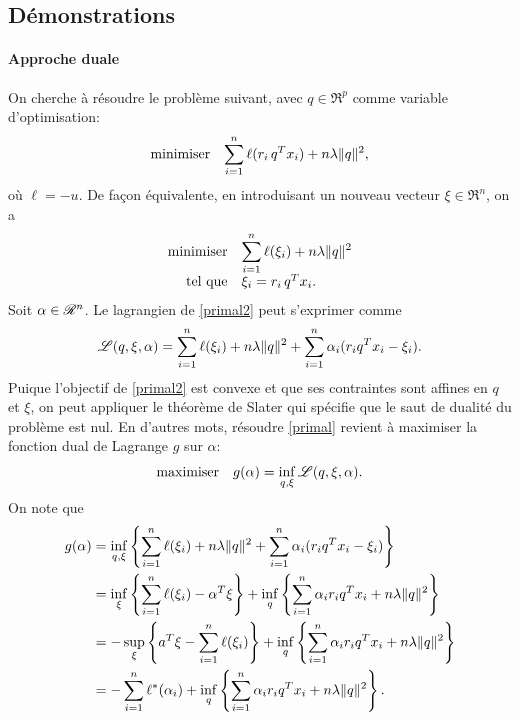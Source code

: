 \subsection{Démonstrations}

\label{k:dem}

\paragraph{Approche duale}

On cherche à résoudre le problème suivant, avec $q \in \Re^p$ comme variable d'optimisation:
\begin{equation}
  \label{primal}
  \begin{array}{ll} \displaystyle{\operatorname*{\mbox{minimiser}}_{}} & \displaystyle{\sum_{i=1}^n\ell(r_i\,q^Tx_i) + n\lambda\|q\|^2,} \end{array}
\end{equation}
où $\ell=-u$. De façon équivalente, en introduisant un nouveau vecteur $\xi \in \Re^n$, on a
\begin{equation}
  \minimizeEquationSt{\label{primal2}\sumi \ell(\xi_i) + n\lambda\|q\|^2}[\xi_i = r_i\,q^Tx_i.] 
\end{equation}
Soit $\alpha\in\mathscr{R}^n$. Le lagrangien de \eqref{primal2} peut s'exprimer comme
\begin{equation}
  \mathscr{L}(q,\xi,\alpha) = \sum_{i=1}^n \ell(\xi_i) + n\lambda\|q\|^2 + \sum_{i=1}^n \alpha_i(r_iq^Tx_i - \xi_i).
\end{equation}
Puique l'objectif de \eqref{primal2} est convexe et que ses contraintes sont affines en
$q$ et $\xi$, on peut appliquer le théorème de Slater qui spécifie que le saut de dualité
du problème est nul. En d'autres mots, résoudre \eqref{primal} revient à maximiser la
fonction dual de Lagrange $g$ sur $\alpha$:
\begin{equation}
  \displaystyle{\begin{array}{ll} \displaystyle{\operatorname*{\mbox{maximiser}}_{}} & \displaystyle{g(\alpha) = \inf_{q,\xi} \mathscr{L}(q,\xi,\alpha).} \end{array}}
\end{equation}
On note que
\begin{align}
  g(\alpha)
  &= \inf_{q,\xi} \left\{\sum_{i=1}^n \ell(\xi_i) + n\lambda\|q\|^2 + \sum_{i=1}^n \alpha_i(r_iq^Tx_i -
    \xi_i)\right\}\\
  &= \inf_\xi\left\{\sum_{i=1}^n \ell(\xi_i) - \alpha^T\xi\right\} + \inf_q\left\{\sum_{i=1}^n \alpha_ir_iq^Tx_i +
    n\lambda\|q\|^2\right\}\\
  & = -\sup_\xi\left\{a^T\xi - \sum_{i=1}^n \ell(\xi_i)\right\} + \inf_q\left\{\sum_{i=1}^n \alpha_ir_iq^Tx_i +
    n\lambda\|q\|^2\right\}\\
  & = -\sum_{i=1}^n \ell^*(\alpha_i) + \inf_q\left\{\sum_{i=1}^n \alpha_ir_iq^Tx_i +n\lambda\|q\|^2\right\}.\label{deriv1} 
\end{align}

